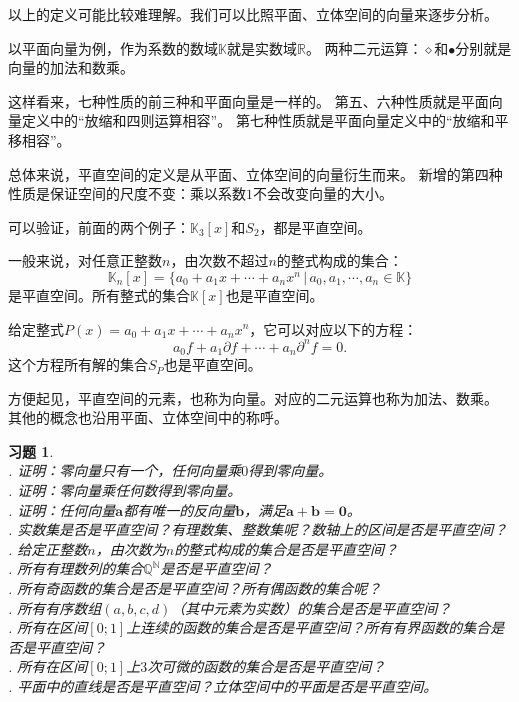 \documentclass[12pt,UTF8]{ctexbook}
\theoremstyle{definition}
\theoremstyle{plain}
\newtheorem{xt}{习题}[section]
\begin{document}
以上的定义可能比较难理解。我们可以比照平面、立体空间的向量来逐步分析。

以平面向量为例，作为系数的数域$\mathbb{K}$就是实数域$\mathbb{R}$。
两种二元运算：$\diamond$和$\bullet$分别就是向量的加法和数乘。

这样看来，七种性质的前三种和平面向量是一样的。
第五、六种性质就是平面向量定义中的“放缩和四则运算相容”。
第七种性质就是平面向量定义中的“放缩和平移相容”。

总体来说，平直空间的定义是从平面、立体空间的向量衍生而来。
新增的第四种性质是保证空间的尺度不变：乘以系数$1$不会改变向量的大小。

可以验证，前面的两个例子：$\mathbb{K}_3[x]$和$S_2$，都是平直空间。

一般来说，对任意正整数$n$，由次数不超过$n$的整式构成的集合：
$$ \mathbb{K}_n[x] = \{a_0 + a_1 x + \cdots + a_n x^n \, | \, a_0, a_1, \cdots , a_n \in \mathbb{K}\} $$
是平直空间。所有整式的集合$\mathbb{K}[x]$也是平直空间。

给定整式$P(x) = a_0 + a_1 x + \cdots + a_n x^n$，它可以对应以下的方程：
$$ a_0 f + a_1 \partial f + \cdots + a_n \partial^n f = 0. $$
这个方程所有解的集合$S_P$也是平直空间。

方便起见，平直空间的元素，也称为向量。对应的二元运算也称为加法、数乘。
其他的概念也沿用平面、立体空间中的称呼。

\begin{xt}
    \mbox{} \\
    . 证明：零向量只有一个，任何向量乘$0$得到零向量。\\
    . 证明：零向量乘任何数得到零向量。\\
    . 证明：任何向量$\mathbf{a}$都有唯一的反向量$\mathbf{b}$，满足$\mathbf{a} + \mathbf{b} = \mathbf{0}$。\\
    . 实数集是否是平直空间？有理数集、整数集呢？数轴上的区间是否是平直空间？\\
    . 给定正整数$n$，由次数为$n$的整式构成的集合是否是平直空间？\\
    . 所有有理数列的集合$\mathbb{Q}^\mathbb{N}$是否是平直空间？\\
    . 所有奇函数的集合是否是平直空间？所有偶函数的集合呢？\\
    . 所有有序数组$(a, b, c, d)$（其中元素为实数）的集合是否是平直空间？\\
    . 所有在区间$[0;1]$上连续的函数的集合是否是平直空间？所有有界函数的集合是否是平直空间？\\
    . 所有在区间$[0;1]$上$3$次可微的函数的集合是否是平直空间？\\
    . 平面中的直线是否是平直空间？立体空间中的平面是否是平直空间。
\end{xt}
\end{document}
